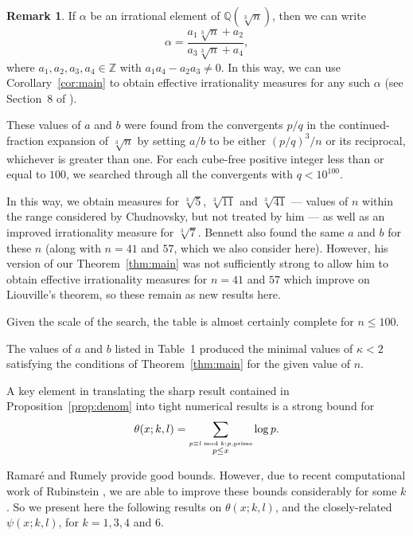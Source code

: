 \documentclass{jT}
\theoremstyle{definition}
\newtheorem*{remark}{Remark}
\begin{document}
\begin{remark}
If $\alpha$ be an irrational element of $\mathbb{Q} \left( \sqrt[3]{n} \right)$, then we can write 
\begin{displaymath}
\alpha = \frac{a_{1} \sqrt[3]{n} + a_{2}}
	      {a_{3} \sqrt[3]{n} + a_{4}}, 
\end{displaymath}
where $a_{1},a_{2},a_{3},a_{4} \in \mathbb{Z}$ with 
$a_{1}a_{4}-a_{2}a_{3} \neq 0$. In this way, we can use
Corollary~\ref{cor:main} to obtain effective irrationality 
measures for any such $\alpha$ (see Section~8 of \cite{Chud}). 
\end{remark}

These values of $a$ and $b$ were found from the convergents $p/q$ in the
continued-fraction expansion of $\sqrt[3]{n}$ by setting $a/b$ to be
either $(p/q)^{3}/n$ or its reciprocal, whichever is greater than one.
For each cube-free positive integer less than or equal to $100$, we 
searched through all the convergents with $q < 10^{100}$.

In this way, we obtain measures for $\sqrt[3]{5}$, $\sqrt[3]{11}$ and $\sqrt[3]{41}$
--- values of $n$ within the range considered by Chudnovsky, but not treated by him
--- as well as an improved irrationality measure for $\sqrt[3]{7}$. Bennett also found
the same $a$ and $b$ for these $n$ (along with $n=41$ and $57$, which we also
consider here). However, his version of our Theorem~\ref{thm:main} was not
sufficiently strong to allow him to obtain effective irrationality measures for $n=41$
and $57$ which improve on Liouville's theorem, so these remain as new results here.

Given the scale of the search, the table is almost certainly complete for $n \leq 100$.

The values of $a$ and $b$ listed in Table~1 produced the minimal values
of $\kappa < 2$ satisfying the conditions of Theorem~\ref{thm:main} for
the given value of $n$.

A key element in translating the sharp result contained in Proposition~\ref{prop:denom}
into tight numerical results is a strong bound for
\begin{displaymath}
\theta(x;k,l)=\sum_{\stackrel{p \equiv l \bmod k; p, {\rm prime}}
			     {p \leq x}} 
			     \log p.
\end{displaymath}                             

Ramar\'{e} and Rumely \cite{RR} provide good bounds. However, due to recent computational work of
Rubinstein \cite{R}, we are able to improve these bounds considerably for some $k$. So we present
here the following results on $\theta(x;k,l)$, and the closely-related $\psi(x;k,l)$, for $k=1,3,4$ and $6$.
\end{document}
